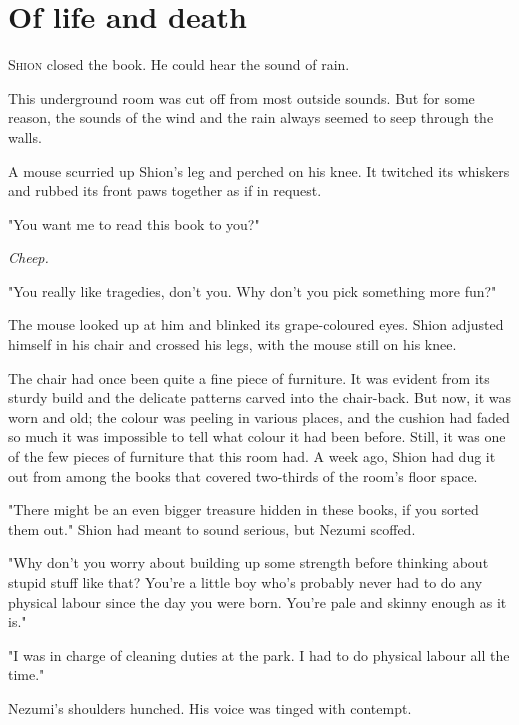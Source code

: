 
\chapter{Of life and death}


\lettrine{S}{hion} closed the book. He could hear the sound of rain.

This underground room was cut off from most outside sounds. But for some
reason, the sounds of the wind and the rain always seemed to seep
through the walls.~

A mouse scurried up Shion's leg and perched on his knee. It twitched its
whiskers and rubbed its front paws together as if in request.

"You want me to read this book to you?"

\emph{Cheep.}

"You really like tragedies, don't you. Why don't you pick something more
fun?"

The mouse looked up at him and blinked its grape-coloured eyes. Shion
adjusted himself in his chair and crossed his legs, with the mouse still
on his knee.

The chair had once been quite a fine piece of furniture. It was evident
from its sturdy build and the delicate patterns carved into the
chair-back. But now, it was worn and old; the colour was peeling in
various places, and the cushion had faded so much it was impossible to
tell what colour it had been before. Still, it was one of the few pieces
of furniture that this room had. A week ago, Shion had dug it out from
among the books that covered two-thirds of the room's floor space.

\myspace

"There might be an even bigger treasure hidden in these books, if you
sorted them out." Shion had meant to sound serious, but Nezumi scoffed.

"Why don't you worry about building up some strength before thinking
about stupid stuff like that? You're a little boy who's probably never
had to do any physical labour since the day you were born. You're pale
and skinny enough as it is."

"I was in charge of cleaning duties at the park. I had to do physical
labour all the time."

Nezumi's shoulders hunched. His voice was tinged with contempt.

